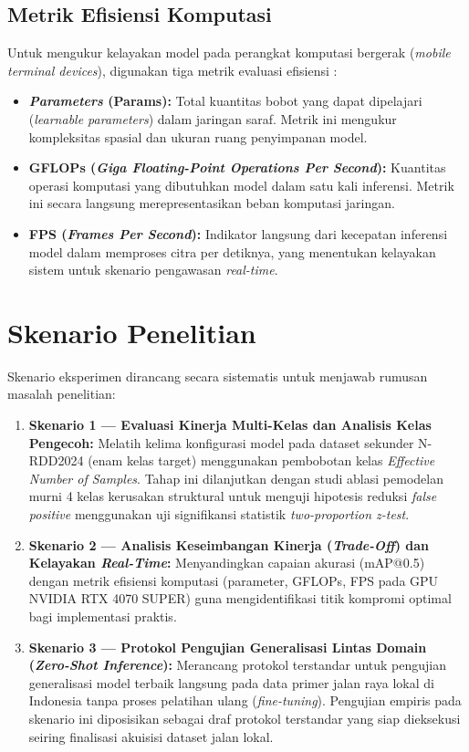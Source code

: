 \subsection{Metrik Efisiensi Komputasi}
Untuk mengukur kelayakan model pada perangkat komputasi bergerak (\textit{mobile terminal devices}), digunakan tiga metrik evaluasi efisiensi \cite{Wu2023, Wang2025}:
\begin{itemize}
	\item \textbf{\textit{Parameters} (Params):} Total kuantitas bobot yang dapat dipelajari (\textit{learnable parameters}) dalam jaringan saraf. Metrik ini mengukur kompleksitas spasial dan ukuran ruang penyimpanan model.
	\item \textbf{GFLOPs (\textit{Giga Floating-Point Operations Per Second}):} Kuantitas operasi komputasi yang dibutuhkan model dalam satu kali inferensi. Metrik ini secara langsung merepresentasikan beban komputasi jaringan.
	\item \textbf{FPS (\textit{Frames Per Second}):} Indikator langsung dari kecepatan inferensi model dalam memproses citra per detiknya, yang menentukan kelayakan sistem untuk skenario pengawasan \textit{real-time}.
\end{itemize}

\section{Skenario Penelitian}
Skenario eksperimen dirancang secara sistematis untuk menjawab rumusan masalah penelitian:
\begin{enumerate}
	\item \textbf{Skenario 1 — Evaluasi Kinerja Multi-Kelas dan Analisis Kelas Pengecoh:} Melatih kelima konfigurasi model pada dataset sekunder N-RDD2024 (enam kelas target) menggunakan pembobotan kelas \textit{Effective Number of Samples}. Tahap ini dilanjutkan dengan studi ablasi pemodelan murni 4 kelas kerusakan struktural untuk menguji hipotesis reduksi \textit{false positive} menggunakan uji signifikansi statistik \textit{two-proportion z-test}.
	\item \textbf{Skenario 2 — Analisis Keseimbangan Kinerja (\textit{Trade-Off}) dan Kelayakan \textit{Real-Time}:} Menyandingkan capaian akurasi (mAP@0.5) dengan metrik efisiensi komputasi (parameter, GFLOPs, FPS pada GPU NVIDIA RTX 4070 SUPER) guna mengidentifikasi titik kompromi optimal bagi implementasi praktis.
	\item \textbf{Skenario 3 — Protokol Pengujian Generalisasi Lintas Domain (\textit{Zero-Shot Inference}):} Merancang protokol terstandar untuk pengujian generalisasi model terbaik langsung pada data primer jalan raya lokal di Indonesia tanpa proses pelatihan ulang (\textit{fine-tuning}). Pengujian empiris pada skenario ini diposisikan sebagai draf protokol terstandar yang siap dieksekusi seiring finalisasi akuisisi dataset jalan lokal.
\end{enumerate}

